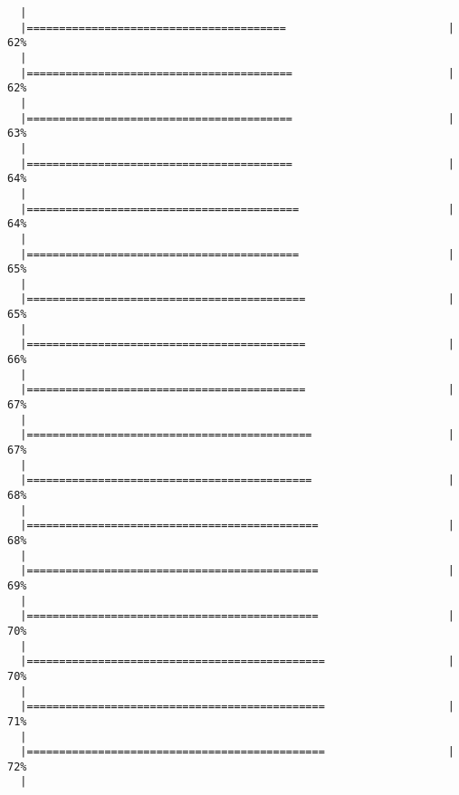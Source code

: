\begin{knitrout}
\begin{kframe}
\begin{verbatim}
  |                                                                       
  |========================================                         |  62%
  |                                                                       
  |=========================================                        |  62%
  |                                                                       
  |=========================================                        |  63%
  |                                                                       
  |=========================================                        |  64%
  |                                                                       
  |==========================================                       |  64%
  |                                                                       
  |==========================================                       |  65%
  |                                                                       
  |===========================================                      |  65%
  |                                                                       
  |===========================================                      |  66%
  |                                                                       
  |===========================================                      |  67%
  |                                                                       
  |============================================                     |  67%
  |                                                                       
  |============================================                     |  68%
  |                                                                       
  |=============================================                    |  68%
  |                                                                       
  |=============================================                    |  69%
  |                                                                       
  |=============================================                    |  70%
  |                                                                       
  |==============================================                   |  70%
  |                                                                       
  |==============================================                   |  71%
  |                                                                       
  |==============================================                   |  72%
  |                                                                       

\end{verbatim}
\end{kframe}
\end{knitrout}
